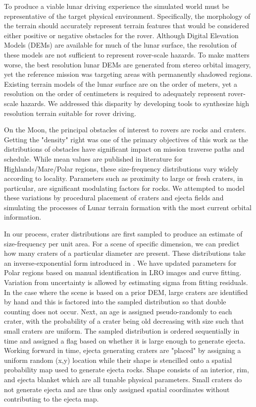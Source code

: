 \documentclass[twocolumn,letterpaper]{IEEEAerospaceCLS}  %
\begin{document}
To produce a viable lunar driving experience the simulated world must be representative of the target physical environment. 
Specifically, the morphology of the terrain should accurately represent terrain features that would be considered either positive or negative obstacles for the rover. 
Although Digital Elevation Models (DEMs) are available for much of the lunar surface, the resolution of these models are not sufficient to represent rover-scale hazards. 
To make matters worse, the best resolution lunar DEMs are generated from stereo orbital imagery, yet the reference mission was targeting areas with permanently shadowed regions. 
Existing terrain models of the lunar surface are on the order of meters, yet a resolution on the order of centimeters is required to adequately represent rover-scale hazards. 
We addressed this disparity by developing tools to synthesize high resolution terrain suitable for rover driving. 

On the Moon, the principal obstacles of interest to rovers are rocks and craters. 
Getting the "density" right was one of the primary objectives of this work as the distributions of obstacles have significant impact on mission traverse paths and schedule. 
While mean values are published in literature \cite{Surveyor1968} for Highlands/Mare/Polar regions, these size-frequency distributions vary widely according to locality. 
Parameters such as proximity to large or fresh craters, in particular, are significant modulating factors for rocks. 
We attempted to model these variations by procedural placement of craters and ejecta fields and simulating the processes of Lunar terrain formation with the most current orbital information. 

In our process, crater distributions are first sampled to produce an estimate of size-frequency per unit area. 
For a scene of specific dimension, we can predict how many craters of a particular diameter are present. 
These distributions take an inverse-exponential form introduced in \cite{Surveyor1968}. 
We have updated parameters for Polar regions based on manual identification in LRO images and curve fitting. 
Variation from uncertainty is allowed by estimating sigma from fitting residuals. 
In the case where the scene is based on a prior DEM, large craters are identified by hand and this is factored into the sampled distribution so that double counting does not occur. 
Next, an age is assigned pseudo-randomly to each crater, with the probability of a crater being old decreasing with size such that small craters are uniform. 
The sampled distribution is ordered sequentially in time and assigned a flag based on whether it is large enough to generate ejecta. 
Working forward in time, ejecta generating craters are "placed" by assigning a uniform random (x,y) location while their shape is stencilled onto a spatial probability map used to generate ejecta rocks. 
Shape consists of an interior, rim, and ejecta blanket which are all tunable physical parameters. 
Small craters do not generate ejecta and are thus only assigned spatial coordinates without contributing to the ejecta map.           
\end{document}
